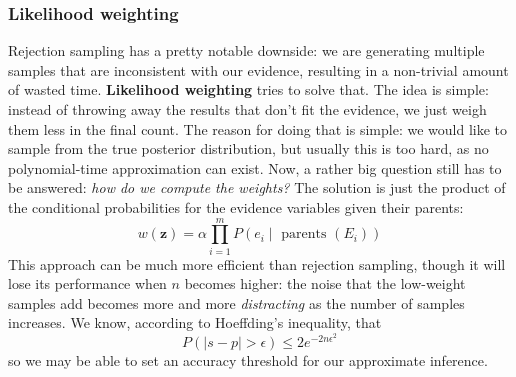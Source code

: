 \subsubsection{Likelihood weighting}
Rejection sampling has a pretty notable downside: we are generating multiple samples that are inconsistent with our evidence, resulting in a non-trivial amount of wasted time. \textbf{Likelihood weighting} tries to solve that. The idea is simple: instead of throwing away the results that don't fit the evidence, we just weigh them less in the final count. The reason for doing that is simple: we would like to sample from the true posterior distribution, but usually this is too hard, as no polynomial-time approximation can exist. Now, a rather big question still has to be answered: \textit{how do we compute the weights?} The solution is just the product of the conditional probabilities for the evidence variables given their parents:
\begin{equation}
    w(\mathbf{z})=\alpha \prod_{i=1}^{m} P\left(e_{i} \mid \text { parents }\left(E_{i}\right)\right)
\end{equation}
This approach can be much more efficient than rejection sampling, though it will lose its performance when $n$ becomes higher: the noise that the low-weight samples add becomes more and more \textit{distracting} as the number of samples increases. We know, according to Hoeffding's inequality, that 
\begin{equation}
    P(|s-p|>\epsilon) \leq 2 e^{-2 n \epsilon^{2}}
\end{equation}
so we may be able to set an accuracy threshold for our approximate inference.

